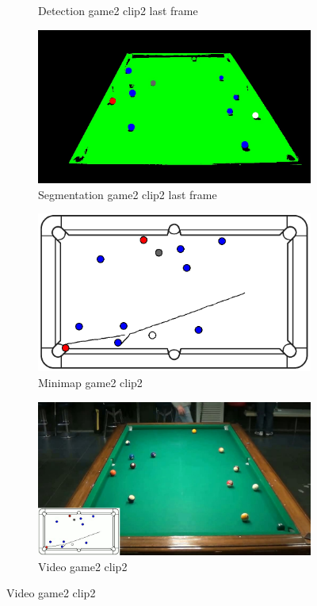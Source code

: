 \begin{figure}[H]
\begin{subfigure}[b]{0.48\textwidth}
		\caption{Detection game2 clip2 last frame}
		\label{fig: game2_clip2_last_frame_detected}
	\end{subfigure}
	\begin{subfigure}[b]{0.48\textwidth}
		\centering
		\includegraphics[width=\textwidth]{images/Segmentation/game2_clip2_segmented_balls_last_frame.jpg}
		\caption{Segmentation game2 clip2 last frame}
		\label{fig: game2_clip2_last_frame_segmented}
	\end{subfigure}
	\begin{subfigure}[b]{0.48\textwidth}
		\centering
		\includegraphics[width=\textwidth]{images/AllMinimap/game2_clip2_minimap.png}
		\caption{Minimap game2 clip2}
		\label{fig: game2_clip2_minimap}
	\end{subfigure}
	\begin{subfigure}[b]{0.48\textwidth}
		\centering
		\includegraphics[width=\textwidth]{images/Video/game2_clip2_video.jpg}
		\caption{Video game2 clip2}
		\label{fig: game2_clip2_video}
	\end{subfigure}


\end{figure}

